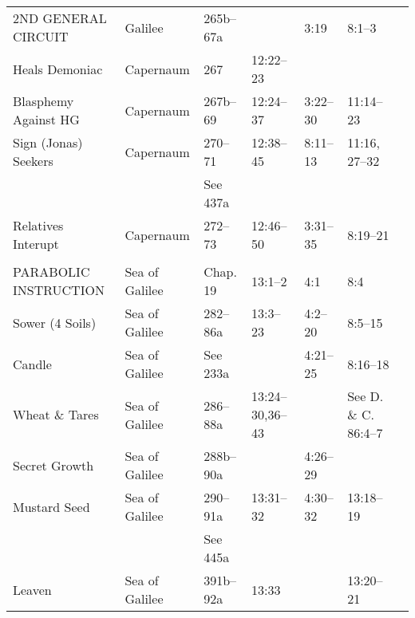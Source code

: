 \begin{longtable}[h]{l@{\hspace{0.5em}}l@{\hspace{0.5em}}l@{\hspace{0.5em}}l@{\hspace{0.5em}}l@{\hspace{0.5em}}l@{\hspace{0.5em}}l@{\hspace{0.5em}}}
2ND GENERAL CIRCUIT                        & Galilee             & 265b--67a          &                   & 3:19               & 8:1--3                & \\
Heals Demoniac                             & Capernaum           & 267                & 12:22--23         &                    &                       & \\
Blasphemy Against HG                       & Capernaum           & 267b--69           & 12:24--37         & 3:22--30           & 11:14--23             & \\
Sign (Jonas) Seekers                       & Capernaum           & 270--71            & 12:38--45         & 8:11--13           & 11:16, 27--32         & \\
                                           &                     & See 437a           &                   &                    &                       & \\
Relatives Interupt                         & Capernaum           & 272--73            & 12:46--50         & 3:31--35           & 8:19--21              & \\
\\
PARABOLIC INSTRUCTION                      & Sea of Galilee      & Chap. 19           & 13:1--2           & 4:1                & 8:4                   & \\
\quad Sower (4 Soils)                      & Sea of Galilee      & 282--86a           & 13:3--23          & 4:2--20            & 8:5--15               & \\
\quad Candle                               & Sea of Galilee      & See 233a           &                   & 4:21--25           & 8:16--18              & \\
\quad Wheat \& Tares                       & Sea of Galilee      & 286--88a           & 13:24--30,36--43  &                    & See D. \& C. 86:4--7  & \\
\quad Secret Growth                        & Sea of Galilee      & 288b--90a          &                   & 4:26--29           &                       & \\
\quad Mustard Seed                         & Sea of Galilee      & 290--91a           & 13:31--32         & 4:30--32           & 13:18--19             & \\
                                           &                     & See 445a           &                   &                    &                       & \\
\quad Leaven                               & Sea of Galilee      & 391b--92a          & 13:33             &                    & 13:20--21             & \\

\end{longtable}
